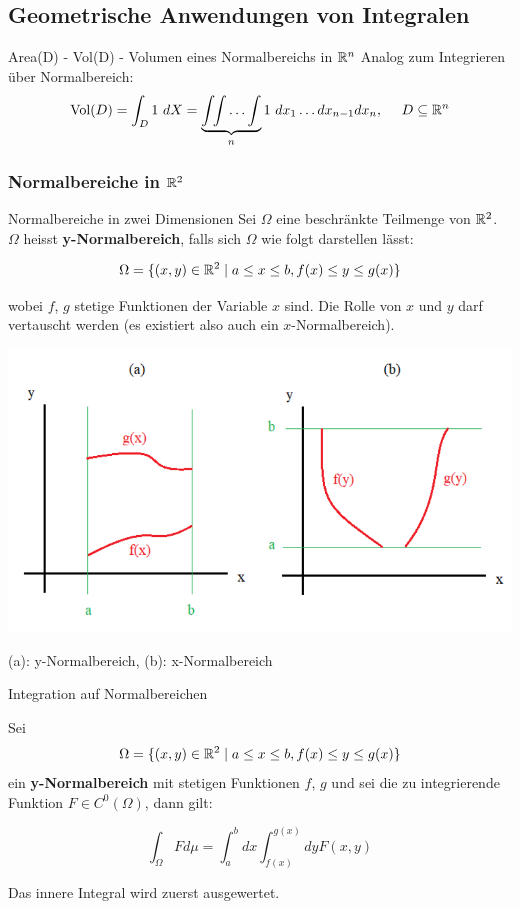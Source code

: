 
\subsection{Geometrische Anwendungen von Integralen}

\begin{Rezept}{Area(D) - Vol(D) - Volumen eines Normalbereichs in $\mathbb{R}^n$}{}
Analog zum Integrieren über Normalbereich:
\[ \text{Vol}(D) = \int_D 1 ~ dX = \underbrace{\int \!\! \int \ldots \int}_{n} 1 ~ dx_1 \ldots dx_{n-1} dx_n,  ~~~~ D \subseteq \mathbb{R}^n\]
\end{Rezept}

\subsubsection{Normalbereiche in $\mathbb{R}^2$}

\begin{Definition}{Normalbereiche in zwei Dimensionen}{}
Sei $\Omega$ eine beschränkte Teilmenge von $\mathbb{R}^2$. $\Omega$ heisst \textbf{y-Normalbereich}, falls sich $\Omega$ wie folgt darstellen lässt:

\[
    \Omega = \{(x, y) \in \mathbb{R}^2 \mid a \leq x \leq b, f(x) \leq y \leq g(x)\}
\]

wobei $f$, $g$ stetige Funktionen der Variable $x$ sind. Die Rolle von $x$ und $y$ darf vertauscht werden (es existiert also auch ein $x$-Normalbereich).

\includegraphics[width=.8\textwidth]{images/normalbereich}

(a): y-Normalbereich, (b): x-Normalbereich

\end{Definition}
\begin{Satz}{Integration auf Normalbereichen}{}

Sei \[\Omega = \{(x, y) \in \mathbb{R}^2 \mid a \leq x \leq b, f(x) \leq y \leq g(x)\}\] ein \textbf{y-Normalbereich} mit stetigen Funktionen $f$, $g$ und sei die zu integrierende Funktion $F \in C^0(\Omega)$, dann gilt:

\[
    \int_{\Omega} F d\mu = \int_a^b dx \int_{f(x)}^{g(x)} dy F(x, y)
\]

Das innere Integral wird zuerst ausgewertet.
\end{Satz}

